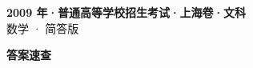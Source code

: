 \documentclass[zihao=-4, a4paper]{ctexart}
\begin{document}
\begin{center}
  {\Large\bfseries 2009 年·普通高等学校招生考试·上海卷·文科}\\[4pt]
  {\large 数学 · 简答版}
\end{center}
\medskip
{}

\clearpage
{}
\begin{center}{\Large\bfseries 答案速查}\end{center}
\medskip

\end{document}
